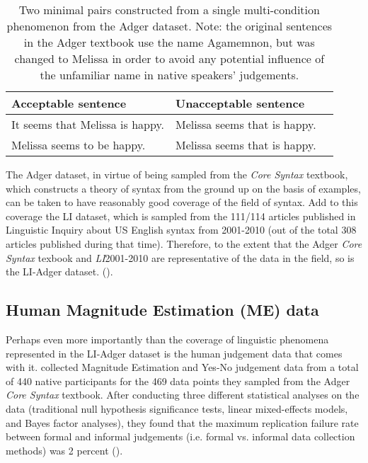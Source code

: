 \begin{table}[h]
    \centering
    \begin{tabular}{llc}
    \toprule
    \textbf{Acceptable sentence} & \textbf{Unacceptable sentence} \\
    \midrule
    It seems that Melissa is happy. & Melissa seems that is happy.\\
    Melissa seems to be happy. & Melissa seems that is happy.\\
    \bottomrule
    \end{tabular}
    \caption[Example multi-condition minimal pairs from the Adger dataset]{Two minimal pairs constructed from a single multi-condition phenomenon from the Adger dataset.  Note: the original sentences in the Adger textbook use the name Agamemnon, but was changed to Melissa in order to avoid any potential influence of the unfamiliar name in native speakers' judgements.}
    \label{tab:table_3}
\end{table}

The Adger dataset, in virtue of being sampled from the \textit{Core Syntax} textbook, which constructs a theory of syntax from the ground up on the basis of examples, can be taken to have reasonably good coverage of the field of syntax.  Add to this coverage the LI dataset, which is sampled from the 111/114 articles published in Linguistic Inquiry about US English syntax from 2001-2010 (out of the total 308 articles published during that time).  Therefore, to the extent that the Adger \textit{Core Syntax} texbook and \textit{LI}2001-2010 are representative of the data in the field, so is the LI-Adger dataset. (\citealp{sprouse2012assessing,sprouse2013comparison}).

\subsection{Human Magnitude Estimation (ME) data}
Perhaps even more importantly than the coverage of linguistic phenomena represented in the LI-Adger dataset is the human judgement data that comes with it. \citet{sprouse2012assessing} collected Magnitude Estimation and Yes-No judgement data from a total of 440 native participants for the 469 data points they sampled from the Adger \textit{Core Syntax} textbook.  After conducting three different statistical analyses on the data (traditional null hypothesis significance tests, linear mixed-effects models, and Bayes factor analyses), they found that the maximum replication failure rate between formal and informal judgements (i.e. formal vs. informal data collection methods) was 2 percent (\citealp{sprouse2012assessing,schutze}).

